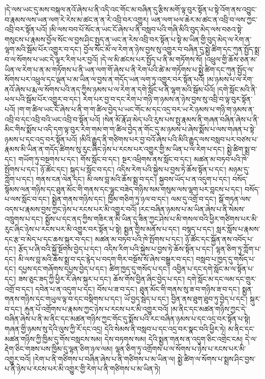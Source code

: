 །དེ་ལས་ཡང་དུ་མས་བསྐལ་ནའོ་ཞེས་པ་ནི་འདི་འང་གོང་མ་བཞིན་དུ་རྩིས་མགོ་ལྟ་བུར་སྟོན་པ་སྟེ་འོག་ནས་འབྱུང་བ་རྣམས་ལས་ཡན་ལག་རེ་རེས་མ་ཚང་ན་ན་རེ་འབྲི་བར་འགྱུར། ཡན་ལག་ཕལ་ཆེར་མ་ཚང་ན་འབྲི་བ་ལས་ཀྱང་འབྲི་བར་སྟོན་པའོ། །མི་ལས་བབ་པོ་སོང་ན་ཡང་ངོ་ཞེས་པ་ནི་བསླབ་པའི་གཞི་མིའི་བུད་མེད་ལས་བཅའ་སྟེ་གསུངས་པ་རྣམས་བྱོལ་སོང་ལ་བྱས་ཤིང་སྤྱད་ན་ཡང་ན་རེས་འབྲི་བར་སྟོན་པ་སྟེ་མ་ཡིན་གྱི་བུད་མེད་ལ་རེག་ན་ལྷག་མའི་སྦོམ་པོར་འགྱུར་བ་དང་། བྱོལ་སོང་མོ་ལ་རེག་ན་ཉེས་བྱས་སུ་འགྱུར་བ་བཞིན་དུ་སྨྱེ་ཚིག་དང་ཀུན་སྤྱོད་སྨྲ་བ་ལ་སོགས་པ་ཡང་དེ་ལྟར་རིག་པར་བྱའོ། །དེ་ལ་མི་ཚངས་པར་སྤྱོད་པ་ནི་མ་གཏོགས་སོ། །འཕྲུལ་གྱི་ཆོས་ཅན་མ་ཡིན་ལ་རེག་པ་ན་མ་གཏོགས་པ་ནི་ཡན་ལག་གོ་ཞེས་པ་ནི་རེག་པའི་ཚེ་མ་གཏོགས་པ་སྨྱེ་ཚིག་དང་ཀུན་སྤྱོད་ལ་སོགས་པར་འཕྲུལ་དང་ལྡན་པ་མ་ཡིན་ལ་བྱས་ན་གདོད་ཡན་ལག་ཏུ་འགྱུར་བར་སྟོན་པའོ། །མ་ཉམས་པ་ལ་རེག་ནའོ་ཞེས་པ་རྨ་ལ་སོགས་པའི་ནད་ཀྱིས་ཉམས་པ་ལ་རེག་ན་དགེ་སློང་ཕ་ནི་ལྷག་མའི་སྦོམ་པོའོ། །དགེ་སློང་མའི་ནི་ཕལ་པའི་སྦོམ་པོར་འགྱུར་བ་དང་། རེག་པར་བྱ་བ་དང་རེག་པ་གཉི་ག་ཉམས་ན་ཉེས་བྱས་སུ་འབྲི་བ་ལྟ་བུར་སྟོན་པའོ། །ག་ག་ཚིལ་ཡང་ངོ་ཞེས་པ་ནི་ག་ག་ཚིལ་བྱེད་པ་ཡང་གོང་མ་དང་འདྲ་བར་ཡ་རེ་ཉམས་པ་གཉི་ག་ཉམས་ན་འབྲི་བ་དང་འབྲི་བའི་ཡང་འབྲི་བ་སྟོན་པའོ། །སེན་མོ་རྣོ་ཤ་མེད་པའི་རུས་པས་སྤུ་རྣམས་ནི་གཞན་བཞིན་ཞེས་པ་ནི་མིང་གིས་སྨོས་པ་འདི་དག་ལྟ་བུར་རེག་གམ་ག་ག་ཚིལ་བྱེད་ན་གོང་དུ་མ་ཉམས་པ་ཞེས་སྨོས་པ་ལས་གཞན་པ་སྟེ་ཉམས་པ་དང་འདྲ་བར་སྟོན་པའོ། །མིའི་རྒྱུད་ནི་གཙིགས་པར་བྱ་བའོ་ཞེས་པའི་མིའི་རྒྱུད་ལས་བསླབ་པར་བཙས་པ་རྣམས་མི་ཡིན་ན་གདོད་ཚིགས་སུ་རུང་ཞིང་ཉེས་པ་རངས་པར་འགྱུར་གྱི་མ་ཡིན་པ་ལ་རེག་པ་དང་། སྨྱེ་ཚིག་སྨྲ་བ་དང་། གཡོག་ཏུ་བསྔགས་པ་དང་། གོས་སློང་བ་དང་། སྔར་འཕྲིགས་ནས་སློང་བ་དང་། མཚན་མ་བཏབ་པའི་ཁེ་སྤོགས་པ་དང་། ཉོ་ཚོང་དང་། སྐུད་པ་སློང་བ་དང་། འདིས་རེག་པའི་སྐྱེས་པ་བྱས་ཏེ་ཆོས་སྟོན་པ་དང་། མཉམ་དུ་ཀློག་པ་དང་། གནས་ངན་ལེན་དང་། མི་ལས་བླ་མའི་ཆོས་སྨྲ་བ་དང་། སྐྱབས་ཡོད་པ་ན་འདུག་པ་དང་། བསོད་སྙོམས་ལན་གཉིས་དང་ཐུན་མོང་གི་གནས་དང་ལྷུང་བཟེད་གཉིས་སམ་གསུམ་ལས་ལྷག་པར་བླངས་པ་དང་། བསོད་པ་ལས་སློང་བ་དང་། སྨྱེན་གནས་གཉིས་དང་། ཁྱིམ་གཅིག་ཏུ་ཉལ་བ་དང་། ལམ་དུ་འགྲོ་བ་དང་། སྒོ་གཏན་ལས་འདས་པ་རྣམས་བྱས་ཀྱང་ཉེས་པ་རངས་པར་མི་འགྱུར་བའོ། །རང་བཞིན་ཉམས་པ་མ་ཡིན་ཞེས་པ་ནི་སེམས་འཁྲུགས་པ་དང་། སྨྱོས་པ་དང་ནད་ཀྱིས་གཟིར་ན་མི་ཡིན་དུ་ཟིན་ཀྱང་ཤེས་པ་མི་གསལ་བའི་ཕྱིར་གཙིགས་པར་མི་རུང་ཞིང་ཉེས་པ་རངས་པར་མི་འགྱུར་བར་སྟོན་པ་སྟེ། སྨྱན་གྱིས་མནོས་པ་དང་། བསྙད་པ་དང་། སླར་སློས་པ་རྣམས་དང་རྩ་བ་མེད་པ་དང་ཆས་སྐུར་བ་དང་། མཚན་མ་བཏབ་པའི་ཁེ་སྤོགས་པ་དང་། ཉོ་ཚོང་དང་སྐྱོན་ནས་འབོད་པ་དང་། རྩོད་པ་ཞི་བའི་སྐྱོ་སྔོགས་བྱེད་པ་དང་། འདིས་རིག་པའི་སྐྱེས་པ་བྱས་ཏེ་ཆོས་སྟོན་པ་དང་། ལྷན་ཅིག་ཏུ་ཀློག་པ་དང་། མི་ལས་བླ་མའི་ཆོས་སྨྲ་བ་དང་རྙེད་པ་བདག་གིར་བསྔོས་སོ་ཞེས་བསྒྱུར་བ་དང་། བསླབ་པ་ཁྱད་དུ་གསོད་པ་དང་། དཔྱས་དང་གཞོགས་དཔྱས་བྱེད་པ་དང་། ཚིག་ཁྱད་དུ་གསོད་པ་དང་། འབྱིན་པ་དང་དགེ་སློང་མ་ལ་སྟོན་པ་དང་། ཟས་ཅུང་ཟད་ཀྱི་ཕྱིར་རོ་ཞེས་སྐུར་པ་དང་། ཆོས་གོས་བྱིན་ཞིང་བྱེད་པ་དང་། དགེ་སློང་མ་དང་ལམ་དང་གྲུར་འགྲོ་བ་དང་། དབེན་པ་ན་འདུག་པ་དང་། བོས་པ་ཟ་བ་དང་། ཐུན་མོང་གི་གནས་སུ་ཟ་བ་གཉིས་ཟ་བ་དང་། སྨྱན་གནས་གཉིས་དང་གཡུལ་ལྟ་བ་དང་བསྡིགས་པ་དང་། ཡོ་བྱད་སྦེད་པ་དང་། བྱིན་ནས་ཐུག་ཐུབ་ཏུ་བྱེད་པ་དང་། སྐུར་བ་དང་། རྐུན་པོ་འགྲོགས་པ་རྣམས་ཀྱང་ཉེས་པ་རངས་པར་མི་འགྱུར་བའོ། །མ་ནིང་དང་མཚན་གཉིས་ཀྱང་དེ་བཞིན་ཞེས་པ་ནི་མ་ནིང་དང་མཚན་གཉིས་ཀྱང་གོང་དུ་སྨོས་པའི་རང་བཞིན་ཉམས་པ་དང་འདྲ་བར་སྟོན་པ་སྟེ། གཞན་གྱི་ཉམས་སུ་དེའི་ལུས་ཀྱི་རོ་དང་འདྲ། དེའི་སེམས་ནི་བསླབ་པ་དང་འདྲ་བར་སྣང་བའི་ཕྱིར་ཏེ། མ་ནིང་དང་མཚན་གཉིས་ཀྱི་ཁྱིམ་དུ་གོས་བསླངས་སམ། དེས་བཏགས་སམ། དེའི་སྨྱན་གནས་ན་འདུག་ཅིང་འགྲེང་ངམ། དེ་ལ་རྡེག་ཅིང་གཟས་པས་ཁྱིམ་དུ་ལྷན་ཅིག་ཉལ་ལམ། ལྷན་ཅིག་ཏུ་འགྲོགས་པ་ལ་སོགས་པ་ཉེས་པ་རངས་པར་མི་འགྱུར་བའོ། །རེག་པ་ནི་གཙིགས་པ་བཞིན་ཞེས་པ་ནི་གཙིགས་པ་མ་ཡིན་ལ། སྨྱེ་ཚིག་ལ་སོགས་པ་སྨྲས་ཤིང་བྱས་པ་ནི་ཉེས་པ་རངས་པར་མི་འགྱུར་གྱི་རེག་པ་ནི་གཙིགས་པ་མ་ཡིན་ཏེ། 